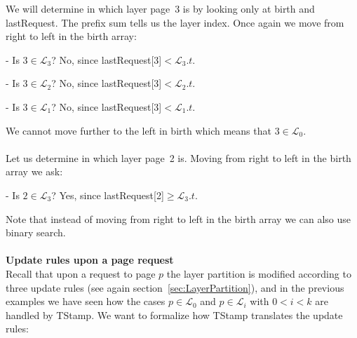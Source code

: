 \documentclass[a4paper,12pt, titlepage]{article}  %
\newcommand{\cl}{\mathcal{L}}   %
\begin{document}
\noindent We will determine in which layer page~3 is by looking only at birth and lastRequest.
The prefix sum tells us the layer index. Once again we move from right to left in the birth array:

- Is $3 \in \cl_3$? No, since lastRequest[3]$<\cl_3.t$.

- Is $3 \in \cl_2$? No, since lastRequest[3]$<\cl_2.t$.

- Is $3 \in \cl_1$? No, since lastRequest[3]$<\cl_1.t$.

\noindent We cannot move further to the left in birth which means that $3\in \cl_0$.\\
\\
\noindent Let us determine in which layer page~2 is. Moving from right to left in the birth array we ask:

- Is $2\in \cl_3$? Yes, since lastRequest[2]$\geq \cl_3.t$.

\noindent Note that instead of moving from right to left in the birth array we can also use binary search.\\
\\
\noindent \textbf{Update rules upon a page request}\\
Recall that upon a request to page $p$ the layer partition is modified according to three update rules (see again section~\ref{sec:LayerPartition}), 
and in the previous examples we have seen how the cases $p \in \cl_0$ and $p \in \cl_i$ with $0<i<k$ are handled by TStamp.
We want to formalize how TStamp translates the update rules:
\end{document}
